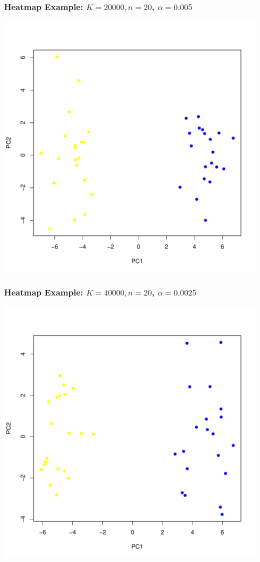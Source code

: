 \documentclass[xcolor=x11names,compress]{beamer}\usepackage[]{graphicx}\usepackage[]{color}
\newenvironment{knitrout}{}{} %
\begin{document}
\begin{frame}[containsverbatim]
  \frametitle{Heatmap Example: $K=20000, n=20$, $\alpha=0.005$}
\begin{knitrout}\tiny
{}\color{fgcolor}

{\centering \includegraphics[width=.5\linewidth]{figure/beamer-pc1-1} 

}



\end{knitrout}

\end{frame}


\begin{frame}[containsverbatim]
  \frametitle{Heatmap Example: $K=40000, n=20$, $\alpha=0.0025$}

\begin{knitrout}\tiny
{}\color{fgcolor}

{\centering \includegraphics[width=.5\linewidth]{figure/beamer-pc2-1} 

}



\end{knitrout}
\end{frame}
\end{document}
